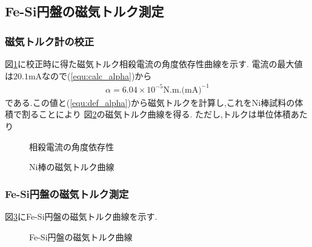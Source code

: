 \subsection{Fe-Si円盤の磁気トルク測定}
\label{subsec:res_Fe-Si}
\subsubsection{磁気トルク計の校正}
\label{subsubsec:res_Fe-Si_adjust}
図\ref{fig:Fe-Si_adjust}に校正時に得た磁気トルク相殺電流の角度依存性曲線を示す.
電流の最大値は$20.1\si{\milli\ampere}$なので(\ref{equ:calc_alpha})から
\begin{align}
  \alpha=6.04\times10^{-5} \si{\newton.\metre.(\milli\ampere)^{-1}}
\end{align}
である.この値と(\ref{equ:def_alpha})から磁気トルクを計算し,これをNi棒試料の体積で割ることにより
図\ref{fig:Fe-Si_adjust_torque}の磁気トルク曲線を得る.
ただし,トルクは単位体積あたり
\begin{figure}[hptb]
  \begin{center}
    
    \caption{相殺電流の角度依存性}
    \label{fig:Fe-Si_adjust}
  \end{center}
\end{figure}
\begin{figure}[hptb]
  \begin{center}
    
    \caption{Ni棒の磁気トルク曲線}
    \label{fig:Fe-Si_adjust_torque}
  \end{center}
\end{figure}
\newpage
\subsubsection{Fe-Si円盤の磁気トルク測定}
図\ref{fig:Fe-Si_torque}にFe-Si円盤の磁気トルク曲線を示す.
\begin{figure}[hptb]
  \begin{center}
    
    \caption{Fe-Si円盤の磁気トルク曲線}
    \label{fig:Fe-Si_torque}
  \end{center}
\end{figure}
